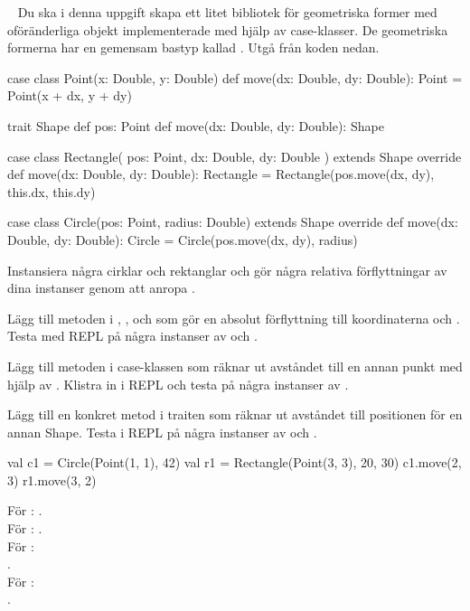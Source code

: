 \QUESTBEGIN

\Task  \what~  Du ska i denna uppgift skapa ett litet bibliotek för geometriska former med oföränderliga objekt implementerade med hjälp av case-klasser. De geometriska formerna har en gemensam bastyp kallad . Utgå från koden nedan.

\begin{Code}
case class Point(x: Double, y: Double) {
  def move(dx: Double, dy: Double): Point = Point(x + dx, y + dy)
}

trait Shape {
  def pos: Point
  def move(dx: Double, dy: Double): Shape
}

case class Rectangle(
  pos: Point,
  dx: Double,
  dy: Double
) extends Shape {
  override def move(dx: Double, dy: Double): Rectangle =
    Rectangle(pos.move(dx, dy), this.dx, this.dy)
}

case class Circle(pos: Point, radius: Double) extends Shape {
  override def move(dx: Double, dy: Double): Circle =
    Circle(pos.move(dx, dy), radius)
}
\end{Code}

\Subtask Instansiera några cirklar och rektanglar och gör några relativa förflyttningar av dina instanser genom att anropa .

\Subtask Lägg till metoden  i , ,  och  som gör en absolut förflyttning till koordinaterna  och . Testa med REPL på några instanser av  och .

\Subtask Lägg till metoden  i case-klassen  som räknar ut avståndet till en annan punkt med hjälp av . Klistra in i REPL och testa på några instanser av .

\Subtask Lägg till en konkret metod  i traiten  som räknar ut avståndet till positionen för en annan Shape. Testa i REPL på några instanser av  och .

\SOLUTION


\TaskSolved \what


\SubtaskSolved
\begin{Code}
val c1 = Circle(Point(1, 1), 42)
val r1 = Rectangle(Point(3, 3), 20, 30)
c1.move(2, 3)
r1.move(3, 2)
\end{Code}

\SubtaskSolved  För : . \\
För : . \\
För :  \\
. \\
För :  \\
.

